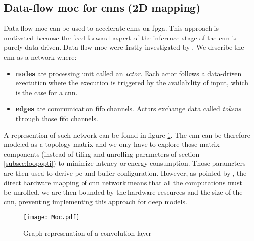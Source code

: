 \subsection{Data-flow \acrshort{moc} for \acrshort{cnn}s (2D mapping)}
%
%
Data-flow \acrfull{moc} can be used to accelerate \acrshort{cnn}s on \acrshort{fpga}. This approach is motivated because the feed-forward aspect of the inference stage of the \acrshort{cnn} is purely data driven.
Data-flow \acrfull{moc} were firstly investigated by \cite{lin_li_low_2016}.  We describe the \acrshort{cnn} as a network where:
\begin{itemize}
    \item \textbf{nodes} are processing unit called an \textit{actor}. Each actor follows a data-driven exectution where the execution is triggered by the availability of input, which is the case for a \acrshort{cnn}.
    \item \textbf{edges} are communication \acrshort{fifo} channels. Actors exchange data called \textit{tokens} through those \acrshort{fifo} channels.
\end{itemize}
A represention of such network can be found in figure \ref{fig:moc}. \newline \newline
The \acrshort{cnn} can be therefore modeled as a topology matrix and we only have to explore those matrix components (instead of tiling and unrolling parameters of section \ref{subsec:loopopti}) to minimize latency or energy consumption. Those parameters are then used to derive \acrshort{pe} and buffer configuration. However, as pointed by \cite{abdelouahab_tactics_2017}, the direct hardware mapping of \acrshort{cnn} network means that all the computations must be unrolled, we are then bounded by the hardware resources and the size of the \acrshort{cnn}, preventing implementing this approach for deep models.
\begin{figure}
    \centering
    \texttt{[image: Moc.pdf]}
    \caption{Graph represenation of a convolution layer}
    \label{fig:moc}
\end{figure}
%
%
